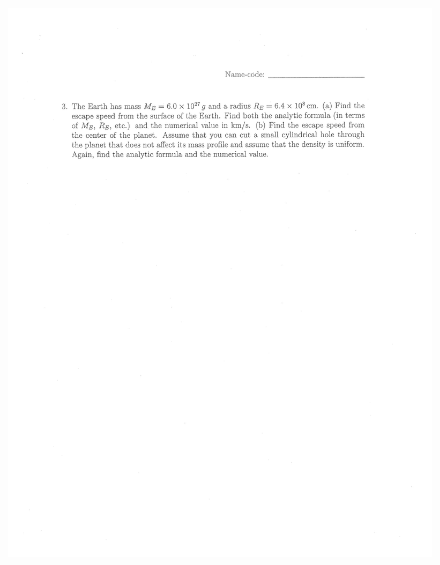 \documentclass[10pt,a4paper]{article}
\begin{document}
\begin{figure}[H]
 \centering
 \includegraphics[width=16cm]{pdf/1-1T48.png}
\end{figure}
 \newpage
\end{document}
